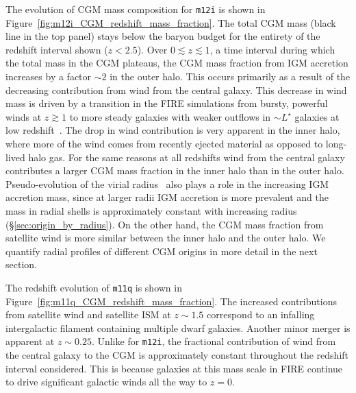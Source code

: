 \documentclass[fleqn,usenatbib]{mnras}
\begin{document}
The evolution of CGM mass composition for \texttt{m12i} is shown in Figure~\ref{fig:m12i_CGM_redshift_mass_fraction}.
The total CGM mass (black line in the top panel) stays below the baryon budget for the entirety of the redshift interval shown ($z<2.5$).
Over $0\lesssim z\lesssim 1$, a time interval during which the total mass in the CGM plateaus, the CGM mass fraction from IGM accretion increases by a factor $\sim 2$ in the outer halo.  
This occurs primarily as a result of the decreasing contribution from wind from the central galaxy. 
This decrease in wind mass is driven by a transition in the FIRE simulations from bursty, powerful winds at $z\gtrsim1$ to more steady galaxies with weaker outflows in $\sim L^{\star}$ galaxies at low redshift~\citep[e.g.][]{Muratov2015,Sparre2017,2017MNRAS.465.1682H,Angles-Alcazar2017,Angles-Alcazar2017a,Faucher-Giguere2017}. 
The drop in wind contribution is very apparent in the inner halo, where more of the wind comes from recently ejected material as opposed to long-lived halo gas.
For the same reasons at all redshifts wind from the central galaxy contributes a larger CGM mass fraction in the inner halo than in the outer halo.
Pseudo-evolution of the virial radius~\citep[e.g.][]{Liang2015} also plays a role in the increasing IGM accretion mass, since at larger radii IGM accretion is more prevalent and the mass in radial shells is approximately constant with increasing radius (\S\ref{sec:origin_by_radius}). 
On the other hand, the CGM mass fraction from satellite wind is more similar between the inner halo and the outer halo. 
We quantify radial profiles of different CGM origins in more detail in the next section.

The redshift evolution of \texttt{m11q} is shown in Figure~\ref{fig:m11q_CGM_redshift_mass_fraction}.
The increased contributions from satellite wind and satellite ISM at $z\sim 1.5$ correspond to an infalling intergalactic filament containing multiple dwarf galaxies. 
Another minor merger is apparent at $z \sim 0.25$. 
Unlike for \texttt{m12i}, the fractional contribution of wind from the central galaxy to the CGM is approximately constant throughout the redshift interval considered. 
This is because galaxies at this mass scale in FIRE continue to drive significant galactic winds all the way to $z=0$.
\end{document}

